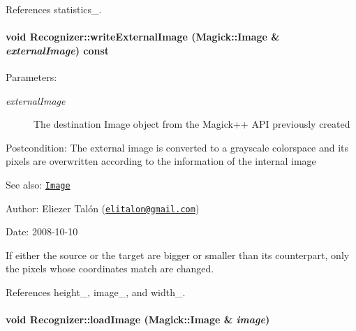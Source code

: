 References statistics\_\-.\hypertarget{class_recognizer_559f62a3e3e2d0b799bab38e975b4b67}{
\paragraph[writeExternalImage]{\setlength{\rightskip}{0pt plus 5cm}void Recognizer::writeExternalImage (Magick::Image \& {\em externalImage}) const}\hfill}
\label{class_recognizer_559f62a3e3e2d0b799bab38e975b4b67}


\begin{Desc}
\item[Parameters:]
\begin{description}
\item[{\em externalImage}]The destination Image object from the Magick++ API previously created\end{description}
\end{Desc}
\begin{Desc}
\item[Postcondition:]The external image is converted to a grayscale colorspace and its pixels are overwritten according to the information of the internal image\end{Desc}
\begin{Desc}
\item[See also:]\href{http://www.imagemagick.org/Magick++/Image.html}{\tt Image}\end{Desc}
\begin{Desc}
\item[Author:]Eliezer Talón (\href{mailto:elitalon@gmail.com}{\tt elitalon@gmail.com}) \end{Desc}
\begin{Desc}
\item[Date:]2008-10-10\end{Desc}
If either the source or the target are bigger or smaller than its counterpart, only the pixels whose coordinates match are changed. 

References height\_\-, image\_\-, and width\_\-.\hypertarget{class_recognizer_acc4244738f2577a0c344c3b3af22eb0}{
\paragraph[loadImage]{\setlength{\rightskip}{0pt plus 5cm}void Recognizer::loadImage (Magick::Image \& {\em image})}\hfill}
\label{class_recognizer_acc4244738f2577a0c344c3b3af22eb0}


